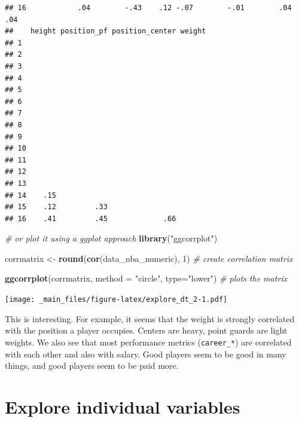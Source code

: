 \documentclass[
]{book}
\newenvironment{Shaded}{\begin{snugshade}}{\end{snugshade}}
\newcommand{\AttributeTok}[1]{\textcolor[rgb]{0.13,0.29,0.53}{#1}}
\newcommand{\CommentTok}[1]{\textcolor[rgb]{0.56,0.35,0.01}{\textit{#1}}}
\newcommand{\DecValTok}[1]{\textcolor[rgb]{0.00,0.00,0.81}{#1}}
\newcommand{\FunctionTok}[1]{\textcolor[rgb]{0.13,0.29,0.53}{\textbf{#1}}}
\newcommand{\NormalTok}[1]{#1}
\newcommand{\OtherTok}[1]{\textcolor[rgb]{0.56,0.35,0.01}{#1}}
\newcommand{\StringTok}[1]{\textcolor[rgb]{0.31,0.60,0.02}{#1}}
\begin{document}
\begin{verbatim}
## 16            .04        -.43    .12 -.07        -.01        .04          .04
##    height position_pf position_center weight
## 1                                           
## 2                                           
## 3                                           
## 4                                           
## 5                                           
## 6                                           
## 7                                           
## 8                                           
## 9                                           
## 10                                          
## 11                                          
## 12                                          
## 13                                          
## 14    .15                                   
## 15    .12         .33                       
## 16    .41         .45             .66
\end{verbatim}

\begin{Shaded}
\begin{Highlighting}[]
\CommentTok{\# or plot it using a ggplot approach}
\FunctionTok{library}\NormalTok{(}\StringTok{"ggcorrplot"}\NormalTok{)}

\NormalTok{corrmatrix }\OtherTok{\textless{}{-}} \FunctionTok{round}\NormalTok{(}\FunctionTok{cor}\NormalTok{(data\_nba\_numeric), }\DecValTok{1}\NormalTok{) }\CommentTok{\# create correlation matrix}

\FunctionTok{ggcorrplot}\NormalTok{(corrmatrix,}
           \AttributeTok{method =} \StringTok{"circle"}\NormalTok{,}
           \AttributeTok{type=}\StringTok{"lower"}\NormalTok{) }\CommentTok{\# plots the matrix}
\end{Highlighting}
\end{Shaded}

\texttt{[image: \_main\_files/figure-latex/explore\_dt\_2-1.pdf]}

This is interesting. For example, it seems that the weight is strongly correlated with the position a player occupies. Centers are heavy, point guards are light weights. We also see that most performance metrics (\texttt{career\_*}) are correlated with each other and also with salary. Good players seem to be good in many things, and good players seem to be paid more.

\hypertarget{explore-individual-variables}{%
\section{Explore individual variables}\label{explore-individual-variables}}
\end{document}
